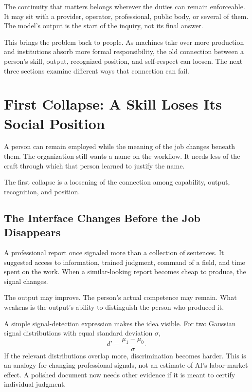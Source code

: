\documentclass[11pt,openany]{book}
\begin{document}
The continuity that matters belongs wherever the duties can remain enforceable. It may sit with a provider, operator, professional, public body, or several of them. The model's output is the start of the inquiry, not its final answer.

This brings the problem back to people. As machines take over more production and institutions absorb more formal responsibility, the old connection between a person's skill, output, recognized position, and self-respect can loosen. The next three sections examine different ways that connection can fail.

\section{First Collapse: A Skill Loses Its Social Position}

A person can remain employed while the meaning of the job changes beneath them. The organization still wants a name on the workflow. It needs less of the craft through which that person learned to justify the name.

The first collapse is a loosening of the connection among capability, output, recognition, and position.

\subsection{The Interface Changes Before the Job Disappears}

A professional report once signaled more than a collection of sentences. It suggested access to information, trained judgment, command of a field, and time spent on the work. When a similar-looking report becomes cheap to produce, the signal changes.

The output may improve. The person's actual competence may remain. What weakens is the output's ability to distinguish the person who produced it.

A simple signal-detection expression makes the idea visible. For two Gaussian signal distributions with equal standard deviation $\sigma$,
\begin{equation}
 d'=\frac{\mu_1-\mu_0}{\sigma}.
\end{equation}
If the relevant distributions overlap more, discrimination becomes harder. This is an analogy for changing professional signals, not an estimate of AI's labor-market effect. A polished document now needs other evidence if it is meant to certify individual judgment.
\end{document}
